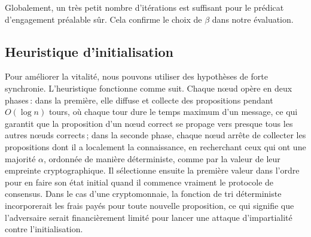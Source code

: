\documentclass[a4,twocolumn,10pt]{article}
\newcommand{\Oh}[1]{O(#1)}
\theoremstyle{definition}
\begin{document}
\begin{appendices}
\noindent Globalement, un très petit nombre d'itérations est suffisant pour le prédicat d'engagement préalable sûr. Cela confirme le choix de $\beta$ dans notre évaluation.

\subsection{Heuristique d'initialisation}
\label{sec:sync-heuristic}
Pour améliorer la vitalité, nous pouvons utiliser des hypothèses de forte synchronie. L'heuristique fonctionne comme suit. Chaque nœud opère en deux phases\,: dans la première, elle diffuse et collecte des propositions pendant $\Oh{\log{n}}$ tours, où chaque tour dure le temps maximum d'un message, ce qui garantit que la proposition d'un nœud correct se propage vers presque tous les autres nœuds corrects\,; dans la se\-conde phase, chaque nœud arrête de collecter les propositions dont il a localement la connaissance, en recherchant ceux qui ont une majorité $\alpha$, ordonnée de manière déterministe, comme par la valeur de leur empreinte cryptographique. Il sélectionne ensuite la première valeur dans l'ordre pour en faire son état initial quand il commence vraiment le protocole de consensus.
Dans le cas d'une cryptomonnaie, la fonction de tri déterministe incorporerait les frais payés pour toute nouvelle proposition, ce qui signifie que l'adversaire serait financièrement limité pour lancer une attaque d'impartialité contre l'initialisation.


\end{appendices}
\end{document}
